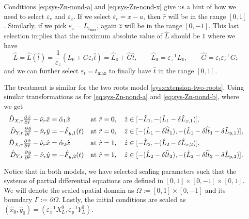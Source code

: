 \documentclass[11pt]{article}
\numberwithin{equation}{section}
\begin{document}
Conditions \eqref{eq:sys-Zn-nond-a} and \eqref{eq:sys-Zn-nond-x} give us a hint of how we need to select \(\varepsilon_r\) and \(\varepsilon_z\). If we select \( \varepsilon_r = x-a\), then \( \hat{r} \) will be in the range \( [0,1]\). Similarly, if we pick \( \varepsilon_z = L_{t_{\max}}\), again \(\hat z \) will be in the range \([0,-1]\). This last selection implies that the maximum absolute value of \( \hat{L}\) should be \(1\) where we have
\[
    \hat{L} = \hat{L}(\hat t) = \frac{1}{\varepsilon_z} ( L_0 + G \varepsilon_t \hat t )
    = \hat{L}_0 + \hat{G} \hat t,
    \qquad 
    \hat{L}_0 = \varepsilon^{-1}_z L_0,
    \qquad
    \hat{G} = \varepsilon_t \varepsilon_z^{-1} G;
\]
and we can further select \( \varepsilon_t = t_{\max}\) to finally have \( \hat t\) in the range \( [0,1]\). 


The treatment is similar for the two roots model \eqref{sys:extension-two-roots}. Using similar transformations as for \eqref{eq:sys-Zn-nond-a} and \eqref{eq:sys-Zn-nond-b}, where we get
\begin{align}
    \hat{D}_{X,r} \pd{\hat{x}}{\hat{r}} - \hat{\nu}_r \hat{x} &= \hat{\alpha}_1 \hat{x}
    &\text{at } \hat{r} &= 0, \quad \hat{z} \in [-\hat{L}_1,-(\hat{L}_1 - \delta \hat{L}_{x,1})],
    \\
    \hat{D}_{Y,r} \pd{\hat{y}}{\hat{r}}  - \hat{\nu}_r \hat{y} &= -\hat{F}_{y,1}(t)     &\text{at } \hat{r} &= 0, \quad \hat{z} \in [-(\hat{L}_1 - \delta \widehat{lt}_1), -(\hat{L}_1 - \delta \widehat{lt}_1 - \delta \hat{L}_{y,1})],
    \\
    \hat{D}_{X,r} \pd{\hat{x}}{\hat{r}} - \hat{\nu}_r \hat{x} &= \hat{\alpha}_2 \hat{x}
    &\text{at } \hat{r} &= 1, \quad \hat{z} \in [-\hat{L}_2, -(\hat{L}_2 - \delta \hat{L}_{x,2})],
    \\
    \hat{D}_{Y,r} \pd{\hat{y}}{\hat{r}}  - \hat{\nu}_r \hat{y} &= -\hat{F}_{y,2}(t)     &\text{at } \hat{r} &= 1, \quad \hat{z} \in [-(\hat{L}_2 - \delta \widehat{lt}_2), -(\hat{L}_2 - \delta \widehat{lt}_2 - \delta \hat{L}_{y,2})].
\end{align}



Notice that in both models, we have selected scaling parameters such that the systems of partial differential equations are defined in \([0,1]\times [0,-1] \times [0,1]\). We will denote the scaled spatial domain as \(\Omega := [0,1]\times [0,-1]\) and its boundary \(\Gamma := \partial \Omega\).
Lastly, the initial conditions are scaled as \( (\hat{x}_0,\hat{y}_0) = (\varepsilon_x^{-1} X^0_L, \varepsilon_y^{-1} Y^0_L) \). 
\end{document}
